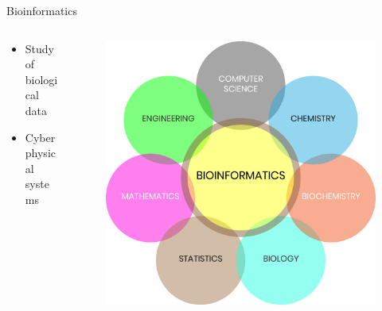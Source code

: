 \documentclass{beamer}
\begin{document}
\begin{frame}{Bioinformatics}
\begin{columns}
	\begin{column}{.45\textwidth}
		\begin{itemize}
			\item Study of biological data
			\item Cyberphysical systems 
		\end{itemize}
	\end{column}
	\begin{column}{.55\textwidth}
		\begin{figure}
			\includegraphics[width=1\linewidth]{img/bio.png}
		\end{figure}
	\end{column}
\end{columns}
\end{frame}
\end{document}
